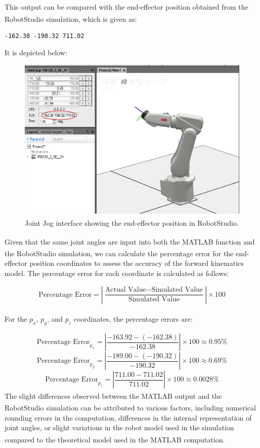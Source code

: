 \noindent This output can be compared with the end-effector position obtained from the RobotStudio\textsuperscript{\textregistered} simulation, which is given as:

\begin{verbatim}
-162.38 -190.32 711.02
\end{verbatim}

\noindent It is depicted below:

\begin{figure}[H]
  \centering
  \includegraphics[width=5.2in ]{pics/rstudi.png}
  \caption{Joint Jog interface showing the end-effector position in RobotStudio\textsuperscript{\textregistered}.}\label{joint_jog}
\end{figure}



\noindent Given that the same joint angles are input into both the MATLAB\textsuperscript{\textregistered} function and the RobotStudio\textsuperscript{\textregistered} simulation, we can calculate the percentage error for the end-effector position coordinates to assess the accuracy of the forward kinematics model. The percentage error for each coordinate is calculated as follows:

\[
  \text{Percentage Error} = \left| \frac{\text{Actual Value} - \text{Simulated Value}}{\text{Simulated Value}} \right| \times 100
\]
\\
For the \( p_x \), \( p_y \), and \( p_z \) coordinates, the percentage errors are:

\[
  \text{Percentage Error}_{p_x} = \left| \frac{-163.92 - (-162.38)}{-162.38} \right| \times 100 \approx 0.95\%
\]
\[
  \text{Percentage Error}_{p_y} = \left| \frac{-189.00 - (-190.32)}{-190.32} \right| \times 100 \approx 0.69\%
\]
\[
  \text{Percentage Error}_{p_z} = \left| \frac{711.00 - 711.02}{711.02} \right| \times 100 \approx 0.0028\%
\]
\noindent
\noindent The slight differences observed between the MATLAB\textsuperscript{\textregistered} output and the RobotStudio\textsuperscript{\textregistered} simulation can be attributed to various factors, including numerical rounding errors in the computation, differences in the internal representation of joint angles, or slight variations in the robot model used in the simulation compared to the theoretical model used in the MATLAB\textsuperscript{\textregistered} computation.

